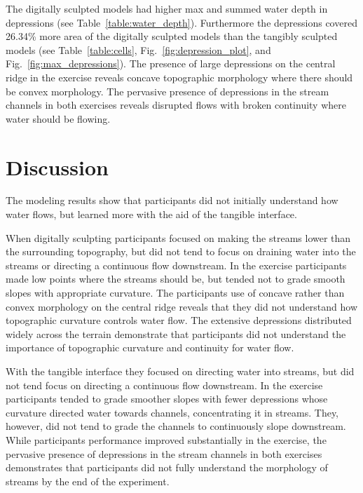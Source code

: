 \documentclass{isprs}
\begin{document}
The digitally sculpted models had higher max and summed 
water depth in depressions (see Table~\ref{table:water_depth}).
%
Furthermore the depressions covered 26.34\% more area of the digitally sculpted models than the tangibly sculpted models (see Table~\ref{table:cells}, Fig.~\ref{fig:depression_plot}, and Fig.~\ref{fig:max_depressions}).
%
The presence of large depressions on the central ridge in the  exercise reveals 
concave topographic morphology where there should be convex morphology.
%
The pervasive presence of depressions in the stream channels in both exercises 
reveals disrupted flows with broken continuity where water should be flowing. 

\section{Discussion}\label{sec:discussion}
%
The modeling results show that participants did not initially understand how water flows, but learned more with the aid of the tangible interface.

When digitally sculpting 
participants focused on making the streams lower than the surrounding topography, 
but did not tend to focus on draining water into the streams or 
directing a continuous flow downstream.
%
In the  exercise participants made low points where the streams should be,
but tended not to grade smooth slopes with appropriate curvature. 
%
The participants use of concave rather than convex morphology on the central ridge reveals that they did not understand how topographic curvature controls water flow.
%
The extensive depressions distributed widely across the terrain
demonstrate that participants did not understand the importance of topographic curvature and continuity for water flow. 

With the tangible interface they focused on directing water into streams,
but did not tend focus on directing a continuous flow downstream.
%
In the  exercise participants tended to grade 
smoother slopes with fewer depressions whose curvature directed water towards channels, concentrating it in streams. They, however, did not tend to grade the channels to continuously slope downstream. 
%
While participants performance improved substantially in the  exercise, 
the pervasive presence of depressions in the stream channels
in both exercises demonstrates that participants did not fully understand the morphology of streams by the end of the experiment. 
\end{document}
